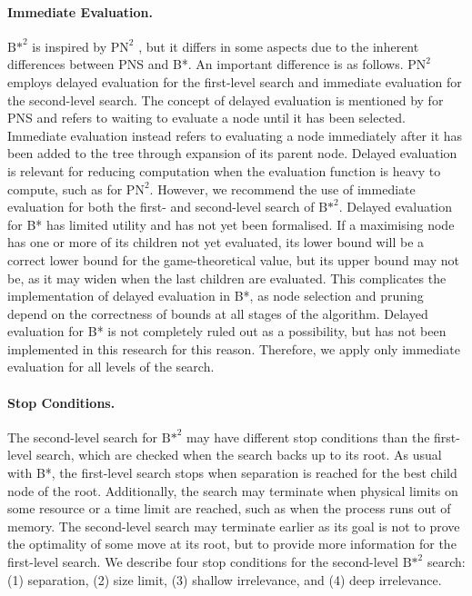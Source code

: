 \paragraph{Immediate Evaluation.}
${\text{B*}}^2$ is inspired by $\text{PN}^2$ \cite{Breuker1998}, but it differs in some aspects due to the inherent differences between PNS and B*. An important difference is as follows. $\text{PN}^2$ employs delayed evaluation for the first-level search and immediate evaluation for the second-level search. The concept of delayed evaluation is mentioned by  for PNS and refers to waiting to evaluate a node until it has been selected. Immediate evaluation instead refers to evaluating a node immediately after it has been added to the tree through expansion of its parent node. Delayed evaluation is relevant for reducing computation when the evaluation function is heavy to compute, such as for $\text{PN}^2$. However, we recommend the use of immediate evaluation for both the first- and second-level search of ${\text{B*}}^2$. Delayed evaluation for B* has limited utility and has not yet been formalised. If a maximising node has one or more of its children not yet evaluated, its lower bound will be a correct lower bound for the game-theoretical value, but its upper bound may not be, as it may widen when the last children are evaluated. This complicates the implementation of delayed evaluation in B*, as node selection and pruning depend on the correctness of bounds at all stages of the algorithm. Delayed evaluation for B* is not completely ruled out as a possibility, but has not been implemented in this research for this reason. Therefore, we apply only immediate evaluation for all levels of the search.

\paragraph{Stop Conditions.}
\label{subsec:BstarSquaredAlgorithm:StopConditions}
The second-level search for ${\text{B*}^2}$ may have different stop conditions than the first-level search, which are checked when the search backs up to its root. As usual with B*, the first-level search stops when separation is reached for the best child node of the root. Additionally, the search may terminate when physical limits on some resource or a time limit are reached, such as when the process runs out of memory. The second-level search may terminate earlier as its goal is not to prove the optimality of some move at its root, but to provide more information for the first-level search. We describe four stop conditions for the second-level ${\text{B*}}^2$ search: (1) separation, (2) size limit, (3) shallow irrelevance, and (4) deep irrelevance.

